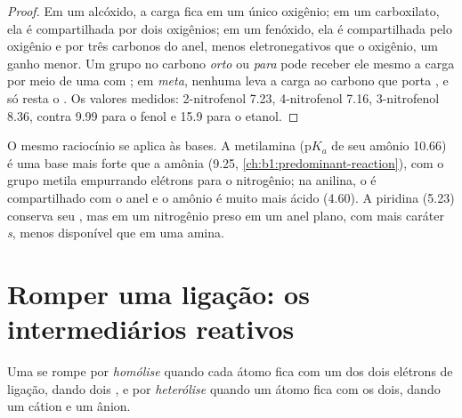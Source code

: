 \begin{proof}
Em um alcóxido, a carga fica em um único oxigênio; em um carboxilato,
ela é compartilhada por dois oxigênios; em um fenóxido, ela é
compartilhada pelo oxigênio e por três carbonos do anel, menos
eletronegativos que o oxigênio, um ganho menor. Um grupo  no
carbono \textit{orto} ou \textit{para} pode receber ele mesmo a carga
por meio de uma  com ; em
\textit{meta}, nenhuma  leva a carga ao carbono
que porta , e só resta o . Os valores medidos:
2-nitrofenol 7.23, 4-nitrofenol 7.16, 3-nitrofenol 8.36, contra 9.99
para o fenol e 15.9 para o etanol.
\end{proof}

O mesmo raciocínio se aplica às bases. A metilamina ($\mathrm{p}K_a$ de
seu amônio 10.66) é uma base mais forte que a amônia (9.25,
\cref{ch:b1:predominant-reaction}), com o grupo metila empurrando
elétrons para o nitrogênio; na anilina, o  é
compartilhado com o anel e o amônio é muito mais ácido (4.60). A
piridina (5.23) conserva seu , mas em um nitrogênio preso
em um anel plano, com mais caráter \textit{s}, menos disponível que em
uma amina.

\section{Romper uma ligação: os intermediários reativos}

\begin{definition}\label{def:b1:electronic-effects:cleavage}
Uma  se rompe por \emph{homólise} quando cada
átomo fica com um dos dois elétrons de ligação, dando dois , e
por \emph{heterólise} quando um átomo fica com os dois,
dando um cátion e um ânion.
\end{definition}

